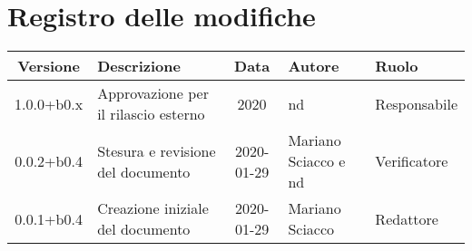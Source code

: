 \section*{Registro delle modifiche}

\begin{center}
	\begin{longtable}{|c|p{3.5cm}|c|p{3cm}|p{3cm}|}
	\hline
	\rowcolor{lighter-grayer}
	\textbf{Versione} & \textbf{Descrizione} & \textbf{Data} & \textbf{Autore} & \textbf{Ruolo} \\
	\hline
	\endfirsthead


	1.0.0+b0.x & Approvazione per il rilascio esterno & 2020 & nd & Responsabile \\
	\hline
	0.0.2+b0.4 & Stesura e revisione del documento & 2020-01-29 & Mariano Sciacco e nd & Verificatore \\
	\hline
	0.0.1+b0.4 & Creazione iniziale del documento & 2020-01-29 & Mariano Sciacco & Redattore \\
	\hline

	\end{longtable}
\end{center}